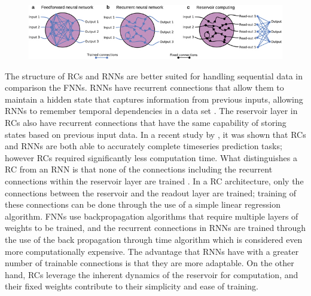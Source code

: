 \documentclass[a4paper,fleqn]{cas-dc}
\begin{document}
\begin{figure}[h!]
    \centering
    \includegraphics{figs/iop_tutorial_image.jpeg}
    \caption{\citep{cucchi_hands-reservoir_2022}}
    
    \label{fig:enter-label}
\end{figure}

The structure of RCs and RNNs are better suited for handling sequential data in comparison the FNNs. RNNs have recurrent connections that allow them to maintain a hidden state that captures information from previous inputs, allowing RNNs to remember temporal dependencies in a data set \citep{medsker_recurrent_2001}.  The reservoir layer in RCs also have recurrent connections that have the same capability of storing states based on previous input data. In a recent study by \cite{shahi2022prediction}, it was shown that RCs and RNNs are both able to accurately complete timeseries prediction tasks; however RCs required significantly less computation time. What distinguishes a RC from an RNN is that none of the connections including the recurrent connections within the reservoir layer are trained \citep{jaeger2001short}. In a RC architecture, only the connections between the reservoir and the readout layer are trained; training of these connections can be done through the use of a simple linear regression algorithm. FNNs use backpropagation algorithms that require multiple layers of weights to be trained, and the recurrent connections in RNNs are trained through the use of the back propagation through time algorithm which is considered even more computationally expensive. The advantage that RNNs have with a greater number of trainable connections is that they are more adaptable. On the other hand, RCs leverage the inherent dynamics of the reservoir for computation, and their fixed weights contribute to their simplicity and ease of training.
\end{document}
